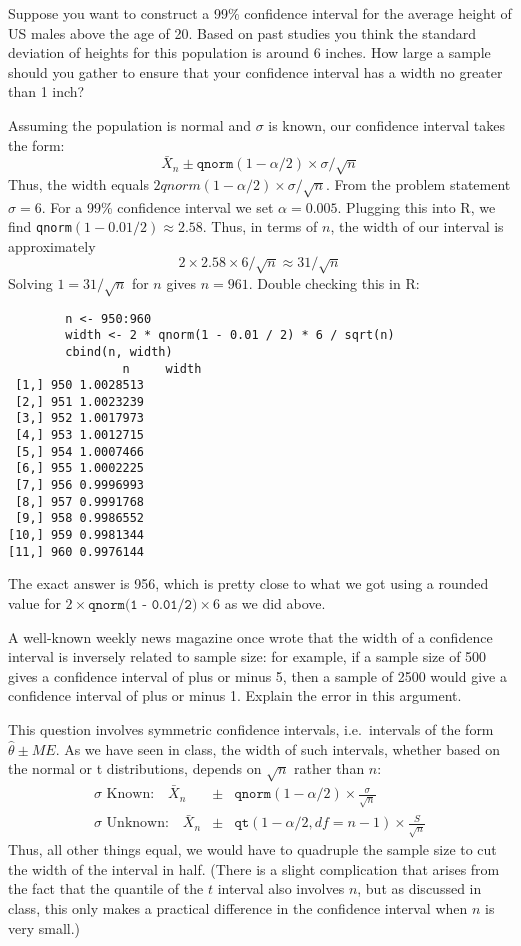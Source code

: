 \documentclass[addpoints,12pt]{exam}
\begin{document}
\begin{questions}
\question Suppose you want to construct a 99\% confidence interval for the average height of US males above the age of 20. Based on past studies you think the standard deviation of heights for this population is around 6 inches. How large a sample should you gather to ensure that your confidence interval has a width no greater than 1 inch?
	\begin{solution}
		Assuming the population is normal and $\sigma$ is known, our confidence interval takes the form:
			$$\bar{X}_n \pm \texttt{qnorm}(1 - \alpha/2) \times \sigma/\sqrt{n}$$
		Thus, the width equals $2 qnorm(1 - \alpha/2) \times \sigma/\sqrt{n}$. From the problem statement $\sigma = 6$. For a 99\% confidence interval we set $\alpha = 0.005$. Plugging this into R, we find \texttt{qnorm}$(1 - 0.01/2) \approx 2.58$. Thus, in terms of $n$, the width of our interval is approximately 
		$$ 2 \times 2.58 \times 6/\sqrt{n} \approx 31/\sqrt{n}$$
		Solving $1 = 31/\sqrt{n}$ for $n$ gives $n = 961$. Double checking this in R:
		\begin{verbatim}
		n <- 950:960
		width <- 2 * qnorm(1 - 0.01 / 2) * 6 / sqrt(n)
		cbind(n, width)
		        n     width
 [1,] 950 1.0028513
 [2,] 951 1.0023239
 [3,] 952 1.0017973
 [4,] 953 1.0012715
 [5,] 954 1.0007466
 [6,] 955 1.0002225
 [7,] 956 0.9996993
 [8,] 957 0.9991768
 [9,] 958 0.9986552
[10,] 959 0.9981344
[11,] 960 0.9976144
		\end{verbatim}
The exact answer is 956, which is pretty close to what we got using a rounded value for $2 \times \texttt{qnorm(1 - 0.01/2)} \times 6$ as we did above.
	\end{solution}

\question A well-known weekly news magazine once wrote that the width of a confidence interval is inversely related to sample size: for example, if a sample size of 500 gives a confidence interval of plus or minus 5, then a sample of 2500 would give a confidence interval of plus or minus 1. Explain the error in this argument.
	\begin{solution}
		This question involves symmetric confidence intervals, i.e.\ intervals of the form $\widehat{\theta} \pm ME$. As we have seen in class, the width of such intervals, whether based on the normal or t distributions, depends on $\sqrt{n}$ rather than $n$:
			\begin{eqnarray*}
			 \sigma \mbox{ Known:} \quad  \bar{X}_n &\pm&  \texttt{qnorm}(1 - \alpha/2) \times \frac{\sigma}{\sqrt{n}}\\
			\sigma \mbox{ Unknown:} \quad  \bar{X}_n &\pm& \texttt{qt}(1 - \alpha/2, df = n-1) \times \frac{S}{\sqrt{n}}
			\end{eqnarray*}
 Thus, all other things equal, we would have to quadruple the sample size to cut the width of the interval in half. (There is a slight complication that arises from the fact that the quantile of the $t$ interval also involves $n$, but as discussed in class, this only makes a practical difference in the confidence interval when $n$ is very small.)
	\end{solution}
  
\end{questions}
\end{document}
